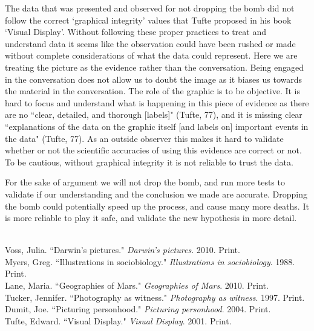 \documentclass[11pt, oneside]{article}
\begin{document}
\par The data that was presented and observed for not dropping the bomb did not follow the correct `graphical integrity' values that Tufte proposed in his book `Visual Display'. Without following these proper practices to treat and understand data it seems like the observation could have been rushed or made without complete considerations of what the data could represent. Here we are treating the picture as the evidence rather than the conversation. Being engaged in the conversation does not allow us to doubt the image as it biases us towards the material in the conversation. The role of the graphic is to be objective. It is hard to focus and understand what is happening in this piece of evidence as there are no ``clear, detailed, and thorough [labels]" (Tufte, 77), and it is missing clear ``explanations of the data on the graphic itself [and labels on] important events in the data" (Tufte, 77). As an outside observer this makes it hard to validate whether or not the scientific accuracies of using this evidence are correct or not. To be cautious, without graphical integrity it is not reliable to trust the data.


\par For the sake of argument we will not drop the bomb, and run more tests to validate if our understanding and the conclusion we made are accurate. Dropping the bomb could potentially speed up the process, and cause many more deaths. It is more reliable to play it safe, and validate the new hypothesis in more detail.

\begin{workscited}
\bibent \\
\bibent Voss, Julia. ``Darwin's pictures."  \textit{Darwin's pictures}.  2010. Print. \\
\bibent Myers, Greg. ``Illustrations in sociobiology."  \textit{Illustrations in sociobiology}.  1988. Print. \\
\bibent Lane, Maria. ``Geographies of Mars."  \textit{Geographies of Mars}.  2010. Print. \\
\bibent Tucker, Jennifer. ``Photography as witness."  \textit{Photography as witness}.  1997. Print. \\
\bibent Dumit, Joe. ``Picturing personhood."  \textit{Picturing personhood}.  2004. Print. \\
\bibent Tufte, Edward. ``Visual Display."  \textit{Visual Display}.  2001. Print. \\
\end{workscited}
\end{document}

